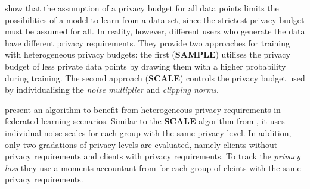 \textcite{boenisch:2023} show that the assumption of a privacy budget for all data points limits the possibilities of a model to learn from a data set, since the strictest privacy budget must be assumed for all. In reality, however, different users who generate the data have different privacy requirements. They provide two approaches for training with heterogeneous privacy budgets: the first (\textbf{SAMPLE}) utilises the privacy budget of less private data points by drawing them with a higher probability during training. The second approach (\textbf{SCALE}) controls the privacy budget used by individualising the \textit{noise multiplier} and \textit{clipping norms}.

\textcite{aldaghri:2023} present an algorithm to benefit from heterogeneous privacy requirements in federated learning scenarios. Similar to the \textbf{SCALE} algorithm from \textcite{boenisch:2023}, it uses individual noise scales for each group with the same privacy level. In addition, only two gradations of privacy levels are evaluated, namely clients without privacy requirements and clients with privacy requirements. To track the \textit{privacy loss} they use a moments accountant from \textcite{abadi:2016} for each group of cleints with the same privacy requirements.

